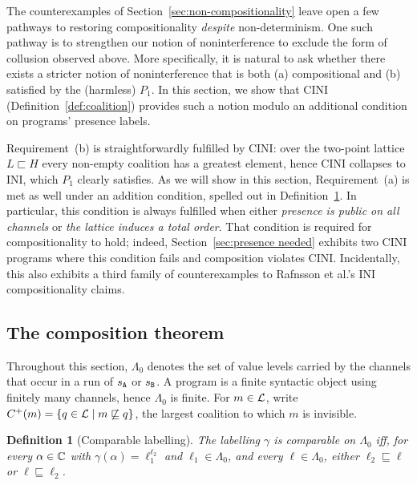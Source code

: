 \documentclass[preprint,5p,twocolumn]{elsarticle}
\newtheorem{definition}[theorem]{Definition}
\begin{document}
\label{sec:coalition composes}

The counterexamples of Section~\ref{sec:non-compositionality} leave open a few pathways
to restoring compositionality \emph{despite} non-determinism. One such pathway is to strengthen
our notion of noninterference to exclude the form of collusion observed above.
More specifically, it is natural to ask whether there exists a stricter
notion of noninterference that is both (a) compositional and (b) satisfied by the (harmless) $P_1$.
In this section, we show that CINI (Definition~\ref{def:coalition}) provides such a notion modulo
an additional condition on programs' presence labels.

Requirement~(b) is straightforwardly fulfilled by CINI:
over the two-point lattice $L \sqsubset H$ every
non-empty coalition has a greatest element, hence CINI collapses to INI, which $P_1$ clearly satisfies.
As we will show in this section, Requirement~(a) is met as well under an addition condition,
spelled out in Definition~\ref{def:presence monotone}.
In particular, this condition is always fulfilled when either \emph{presence is public on all channels}
or \emph{the lattice induces a total order}. That condition is required for compositionality to hold;
indeed, Section~\ref{sec:presence needed} exhibits two CINI programs where this
condition fails and composition violates CINI. Incidentally, this also exhibits a third family
of counterexamples to Rafnsson et al.'s INI compositionality claims.

\subsection{The composition theorem}

\label{sec:cini composes}

Throughout this section, $\Lambda_0$ denotes the set of value levels carried by the channels that
occur in a run of $s_{\mathtt{A}}$ or $s_{\mathtt{B}}$. A program is a finite syntactic object using finitely many
channels, hence $\Lambda_0$ is finite. For $m \in \mathcal{L}$, write
$C^+(m) = \lbrace q \in \mathcal{L} \mid m \not\sqsubseteq q \rbrace$, the largest coalition to which
$m$ is invisible.

\begin{definition}[Comparable labelling]
  \label{def:presence monotone}
  The labelling $\gamma$ is \emph{comparable on $\Lambda_0$} iff, for every $\alpha \in \mathbb{C}$
  with $\gamma(\alpha) = \ell_1^{\ell_2}$ and $\ell_1 \in \Lambda_0$, and every
  $\ell \in \Lambda_0$, either $\ell_2 \sqsubseteq \ell$ or $\ell \sqsubseteq \ell_2$.
\end{definition}
\end{document}
